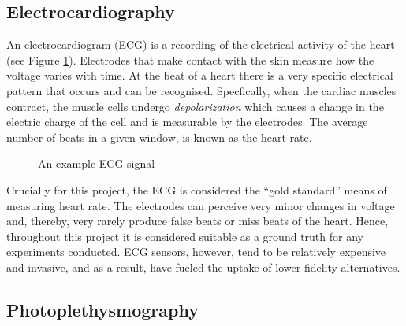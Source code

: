 \subsection{Electrocardiography}
An electrocardiogram (ECG) is a recording of the electrical activity of the heart (see Figure \ref{fig:ecg_signal}). Electrodes that make contact with the skin measure how the voltage varies with time.
At the beat of a heart there is a very specific electrical pattern that occurs and can be recognised. Specfically, when the cardiac muscles contract, the muscle cells undergo
\textit{depolarization} which causes a change in the electric charge of the cell and is measurable by the electrodes.
The average number of beats in a given window, is known as the heart rate.
\begin{figure}
    \centering
    \scalebox{0.8}{}
   \caption{An example ECG signal} 
   \label{fig:ecg_signal}
\end{figure}
\noindent
Crucially for this project, the ECG is considered the ``gold standard'' means of measuring heart rate. The electrodes can perceive very minor changes in voltage and, thereby, very rarely produce false beats or miss beats of the heart. 
Hence, throughout this project it is considered suitable as a ground truth for any experiments conducted.
ECG sensors, however, tend to be relatively expensive and invasive, and as a result, have fueled the uptake of lower fidelity alternatives.

\subsection{Photoplethysmography}


